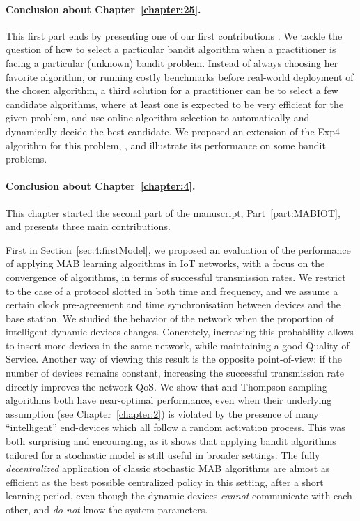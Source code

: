 \paragraph{Conclusion about \textbf{Chapter~\ref{chapter:25}}.}
%
This first part ends by presenting one of our first contributions \cite{Besson2018WCNC}.
We tackle the question of how to select a particular bandit algorithm when a practitioner is facing a particular (unknown) bandit problem.
Instead of always choosing her favorite algorithm, or running costly benchmarks before real-world deployment of the chosen algorithm, a third solution for a practitioner can be to select a few candidate algorithms, where at least one is expected to be very efficient for the given problem, and use online algorithm selection to automatically and dynamically decide the best candidate.
We proposed an extension of the Exp4 algorithm for this problem, \Aggr, and illustrate its performance on some bandit problems.


\paragraph{Conclusion about \textbf{Chapter~\ref{chapter:4}}.}

This chapter started the second part of the manuscript, Part~\ref{part:MABIOT}, and presents three main contributions.

First in Section~\ref{sec:4:firstModel}, we proposed an evaluation of the performance of applying MAB learning algorithms in IoT networks,
with a focus on the convergence of algorithms, in terms of successful transmission rates.
We restrict to the case of a protocol slotted in both time and frequency, and we assume a certain clock pre-agreement and time synchronisation between devices and the base station.
We studied the behavior of the network when the proportion of intelligent dynamic devices changes.
Concretely, increasing this probability allows to insert more devices in the same network, while maintaining a good Quality of Service.
Another way of viewing this result is the opposite point-of-view: if the number of devices remains constant, increasing the successful transmission rate directly improves the network QoS.
We show that \UCB{} and Thompson sampling algorithms both have near-optimal performance, even when their underlying \iid{} assumption (see Chapter~\ref{chapter:2}) is violated by the presence of many ``intelligent'' end-devices which all follow a random activation process.
%
This was both surprising and encouraging, as it shows that applying bandit algorithms tailored for a stochastic model is still useful in broader settings.
The fully \emph{decentralized} application of classic stochastic MAB algorithms are almost as efficient as the best possible centralized policy in this setting, after a short learning period, even though the dynamic devices \emph{cannot} communicate with each other, and \emph{do not} know the system parameters.



